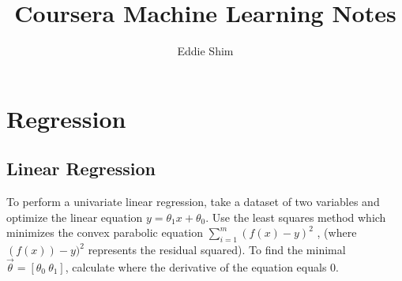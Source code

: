 \documentclass[titlepage]{article}
\author{Eddie Shim}
\title{Coursera Machine Learning Notes}
\begin{document}
	\maketitle
	
	\section{Regression}
	\subsection{Linear Regression}
	To perform a univariate linear regression, take a dataset of two variables and optimize the linear equation $y = \theta_1 x + \theta_0$. Use the least squares method which minimizes the convex parabolic equation $\sum_{i=1}^{m} (f(x) - y)^2$ , (where $(f(x)) -y)^2$ represents the residual squared). To find the minimal $\vec \theta = [\theta_0 \ \theta_1]$, calculate where the derivative of the equation equals 0. 
	
\end{document}
